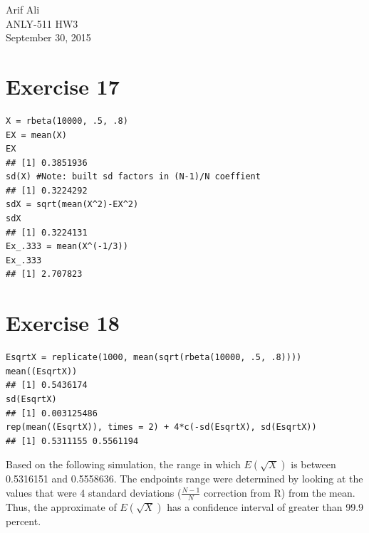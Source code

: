 \documentclass{article}\usepackage[]{graphicx}\usepackage[]{color}
\makeatletter
\newenvironment{kframe}{%
 \def\at@end@of@kframe{}%
 \ifinner\ifhmode%
  \def\at@end@of@kframe{\end{minipage}}%
  \begin{minipage}{\columnwidth}%
 \fi\fi%
 \def\FrameCommand##1{\hskip\@totalleftmargin \hskip-\fboxsep
 \colorbox{shadecolor}{##1}\hskip-\fboxsep
     \hskip-\linewidth \hskip-\@totalleftmargin \hskip\columnwidth}%
 \MakeFramed {\advance\hsize-\width
   \@totalleftmargin\z@ \linewidth\hsize
   \@setminipage}}%
 {\par\unskip\endMakeFramed%
 \at@end@of@kframe}
\newenvironment{knitrout}{}{} %
\makeatother
\begin{document}
\begin{flushright}
  Arif Ali\\
  ANLY-511 HW3\\
  September 30, 2015\\
\end{flushright}
\begin{center}
\end{center}
\section*{Exercise 17}
\begin{knitrout}
\color{fgcolor}\begin{kframe}
\begin{verbatim}
X = rbeta(10000, .5, .8)
EX = mean(X)
EX
## [1] 0.3851936
sd(X) #Note: built sd factors in (N-1)/N coeffient
## [1] 0.3224292
sdX = sqrt(mean(X^2)-EX^2)
sdX
## [1] 0.3224131
Ex_.333 = mean(X^(-1/3))
Ex_.333
## [1] 2.707823
\end{verbatim}
\end{kframe}
\end{knitrout}
\section*{Exercise 18}
\begin{knitrout}
\color{fgcolor}\begin{kframe}
\begin{verbatim}
EsqrtX = replicate(1000, mean(sqrt(rbeta(10000, .5, .8))))
mean((EsqrtX))
## [1] 0.5436174
sd(EsqrtX)
## [1] 0.003125486
rep(mean((EsqrtX)), times = 2) + 4*c(-sd(EsqrtX), sd(EsqrtX))
## [1] 0.5311155 0.5561194
\end{verbatim}
\end{kframe}
\end{knitrout}
Based on the following simulation, the range in which $E(\sqrt{X})$ is between 0.5316151 and 0.5558636. The endpoints range were
determined by looking at the values that were 4 standard deviations ($\frac{N-1}{N}$ correction from R) from the mean. Thus, the
approximate of $E(\sqrt{X})$ has a confidence interval of greater than 99.9 percent.  
\end{document}
